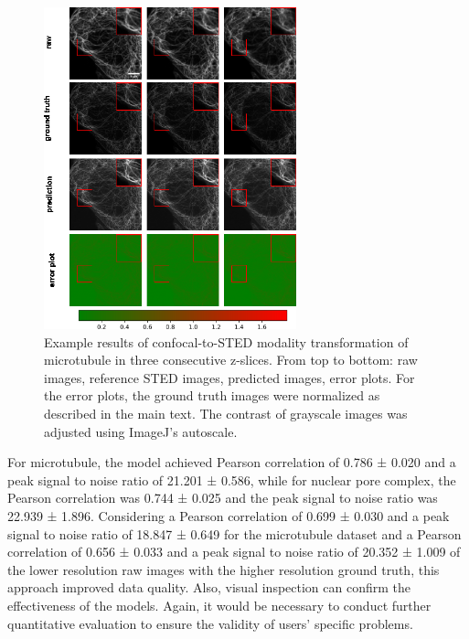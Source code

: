 \begin{figure}
\hypertarget{fig:modality_mt}{%
\centering
\includegraphics[width=0.65\textwidth,height=0.7\textheight]{images/mt_manuscript.png}
\caption{Example results of confocal-to-STED modality transformation of microtubule in three consecutive z-slices. From top to bottom: raw images, reference STED images, predicted images, error plots. For the error plots, the ground truth images were normalized as described in the main text. The contrast of grayscale images was adjusted using ImageJ's autoscale.}\label{fig:modality_mt}
}
\end{figure}

For microtubule, the model achieved Pearson correlation of 0.786 ± 0.020 and a peak signal to noise ratio of 21.201 ± 0.586, while for nuclear pore complex, the Pearson correlation was 0.744 ± 0.025 and the peak signal to noise ratio was 22.939 ± 1.896. Considering a Pearson correlation of 0.699 ± 0.030 and a peak signal to noise ratio of 18.847 ± 0.649 for the microtubule dataset and a Pearson correlation of 0.656 ± 0.033 and a peak signal to noise ratio of 20.352 ± 1.009 of the lower resolution raw images with the higher resolution ground truth, this approach improved data quality. Also, visual inspection can confirm the effectiveness of the models. Again, it would be necessary to conduct further quantitative evaluation to ensure the validity of users' specific problems.

